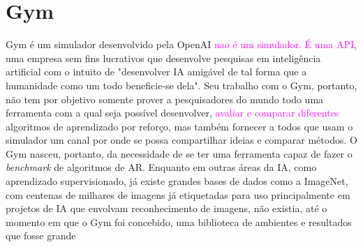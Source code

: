 \documentclass[cic,tc]{iiufrgs}
\newcommand\bruno[1]{\textcolor{magenta}{#1}}
\begin{document}
    \section{Gym}
    Gym é um simulador desenvolvido pela OpenAI \bruno{nao é um simulador. É uma API}, uma empresa sem fins lucrativos que desenvolve pesquisas em inteligência artificial com o intuito de
    "desenvolver IA amigável de tal forma que a humanidade como um todo beneficie-se dela". Seu trabalho com o Gym, portanto, não tem por objetivo
    somente prover a pesquisadores do mundo todo uma ferramenta com a qual seja possível desenvolver, \bruno{avaliar e comparar diferentes} algoritmos de aprendizado por reforço, mas também
    fornecer a todos que usam o simulador um canal por onde se possa compartilhar ideias e comparar métodos. O Gym nasceu, portanto, da necessidade de
    se ter uma ferramenta capaz de fazer o \textit{benchmark} de algoritmos de AR. Enquanto em outras áreas da IA, como aprendizado supervisionado,
    já existe grandes bases de dados como a ImageNet, com centenas de milhares de imagens já etiquetadas para uso principalmente em projetos de IA que
    envolvam reconhecimento de imagens, não existia, até o momento em que o Gym foi concebido, uma biblioteca de ambientes e resultados que fosse grande
\end{document}

